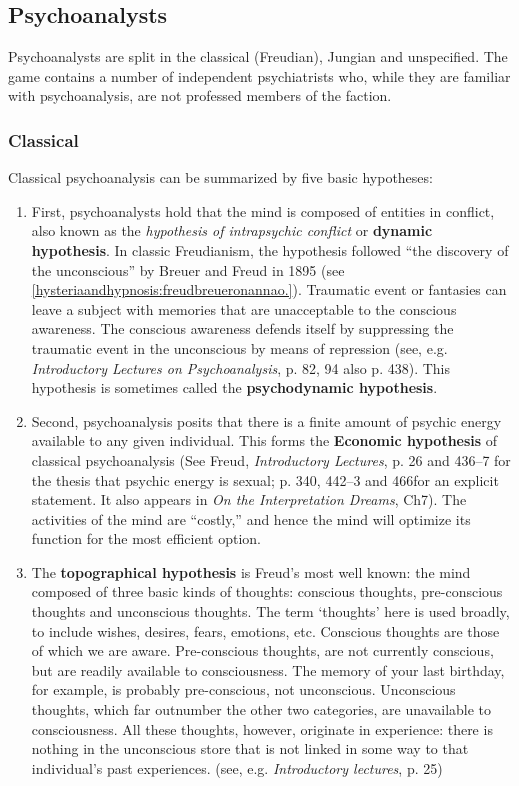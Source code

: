 \begin{refsection}
\subsection{Psychoanalysts}
\label{psychoanalysts}

Psychoanalysts are split in the classical (Freudian), Jungian and unspecified. The game contains a number of independent psychiatrists who, while they are familiar with psychoanalysis, are not professed members of the faction.

\subsubsection{Classical}
\label{classical}

Classical psychoanalysis can be summarized by five basic hypotheses:

\begin{enumerate}
\item First, psychoanalysts hold that the mind is composed of entities in conflict, also known as the \emph{hypothesis of intrapsychic conflict} or \textbf{dynamic hypothesis}. In classic Freudianism, the hypothesis followed ``the discovery of the unconscious'' by Breuer and Freud in 1895 (see \ref{hysteriaandhypnosis:freudbreueronannao.}). Traumatic event or fantasies can leave a subject with memories that are unacceptable to the conscious awareness. The conscious awareness defends itself by suppressing the traumatic event in the unconscious by means of repression (see, e.g. \emph{Introductory Lectures on Psychoanalysis}, p. 82, 94 also p. 438). This hypothesis is sometimes called the \textbf{psychodynamic hypothesis}.

\item Second, psychoanalysis posits that there is a finite amount of psychic energy available to any given individual. This forms the \textbf{Economic hypothesis} of classical psychoanalysis (See Freud, \emph{Introductory Lectures}, p. 26 and 436--7 for the thesis that psychic energy is sexual; p. 340, 442--3 and 466for an explicit statement. It also appears in \emph{On the Interpretation Dreams}, Ch7). The activities of the mind are ``costly,'' and hence the mind will optimize its function for the most efficient option.

\item The \textbf{topographical hypothesis} is Freud's most well known: the mind composed of three basic kinds of thoughts: conscious thoughts, pre-conscious thoughts and unconscious thoughts. The term `thoughts' here is used broadly, to include wishes, desires, fears, emotions, etc. Conscious thoughts are those of which we are aware. Pre-conscious thoughts, are not currently conscious, but are readily available to consciousness. The memory of your last birthday, for example, is probably pre-conscious, not unconscious. Unconscious thoughts, which far outnumber the other two categories, are unavailable to consciousness. All these thoughts, however, originate in experience: there is nothing in the unconscious store that is not linked in some way to that individual's past experiences. (see, e.g. \emph{Introductory lectures}, p. 25)


\end{enumerate}
\end{refsection}
